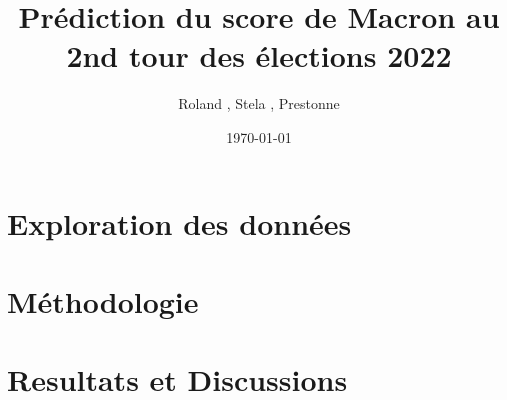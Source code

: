 

\newcommand{\BN}{ \beta \mathbb{N}}
\newcommand{\N}{\mathbb{N}}
\newcommand{\R}{\mathbb{R}}
\renewcommand{\O}{\mathcal{O}}
\renewcommand{\t}{\text}




\title{Prédiction du score de Macron au 2nd tour des élections 2022}
\author{Roland , Stela , Prestonne}
\date{ \today } 
 




\begin{frame} 
    \titlepage
\end{frame}

\begin{frame}
    \tableofcontents
\end{frame}


\section{Exploration des données}


\section{Méthodologie}


\section{Resultats et Discussions}



